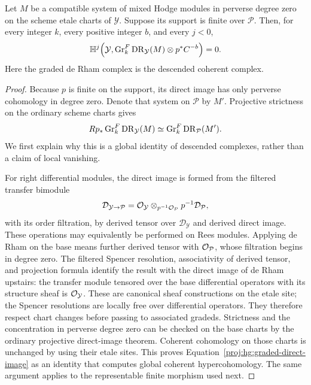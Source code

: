 \begin{lemma}\label{proj:hg:negative-vanishing}
Let \(M\) be a compatible system of mixed Hodge modules in perverse
degree zero on the scheme etale charts of \(\mathcal Y\).  Suppose
its support is finite over \(\mathcal P\).  Then, for every integer
\(k\), every positive integer \(b\), and every \(j<0\),
\[
 \mathbb H^j\!\left(
   \mathcal Y,\operatorname{Gr}^F_k\operatorname{DR}_{\mathcal Y}(M)\otimes p^*C^{-b}
 \right)=0.
\]
Here the graded de Rham complex is the descended coherent complex.
\end{lemma}

\begin{proof}
Because \(p\) is finite on the support, its direct image has only
perverse cohomology in degree zero.  Denote that system on
\(\mathcal P\) by \(M'\).  Projective strictness on the ordinary
scheme charts gives
\begin{equation}\label{proj:hg:graded-direct-image}
 Rp_*\operatorname{Gr}^F_k\operatorname{DR}_{\mathcal Y}(M)
 \simeq \operatorname{Gr}^F_k\operatorname{DR}_{\mathcal P}(M').
\end{equation}
We first explain why this is a global identity of descended complexes,
rather than a claim of local vanishing.

For right differential modules, the direct image is formed from the
filtered transfer bimodule
\[
 \mathcal D_{\mathcal Y\to\mathcal P}
 =
 \mathcal{O}_{\mathcal Y}\otimes_{p^{-1}\mathcal{O}_{\mathcal P}}
                         p^{-1}\mathcal D_{\mathcal P},
\]
with its order filtration, by derived tensor over
\(\mathcal D_{\mathcal Y}\) and derived direct image.  These operations
may equivalently be performed on Rees modules.  Applying de Rham on
the base means further derived tensor with \(\mathcal{O}_{\mathcal P}\),
whose filtration begins in degree zero.  The filtered Spencer
resolution, associativity of derived tensor, and projection formula
identify the result with the direct image of de Rham upstairs:
the transfer module tensored over the base differential operators
with its structure sheaf is \(\mathcal{O}_{\mathcal Y}\).
These are canonical sheaf constructions on the etale site; the
Spencer resolutions are locally free over differential operators.
They therefore respect chart changes before passing to associated
gradeds.  Strictness and the concentration in perverse degree zero
can be checked on the base charts by the ordinary projective
direct-image theorem.  Coherent cohomology on those charts is
unchanged by using their etale sites.  This proves
Equation~\eqref{proj:hg:graded-direct-image} as an identity that computes
global coherent hypercohomology.  The same argument applies to the
representable finite morphism used next.


\end{proof}
